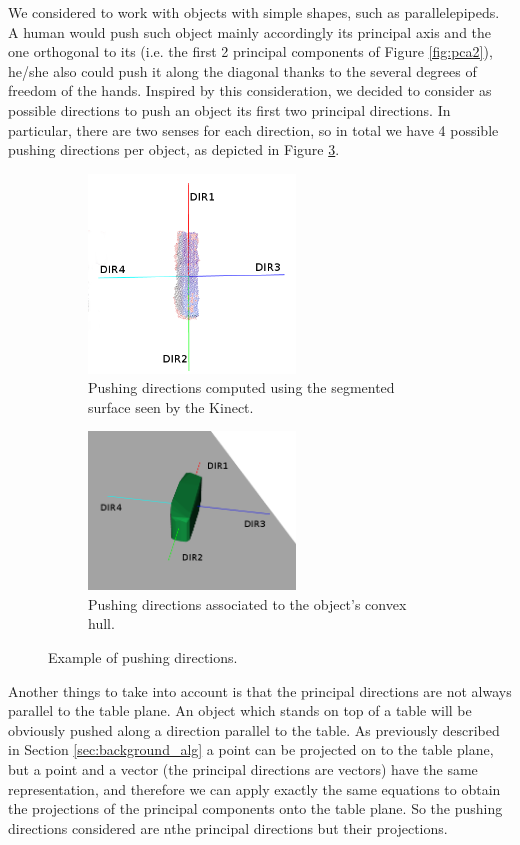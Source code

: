 We considered to work with objects with simple shapes, such as parallelepipeds. 
A human would push such object mainly accordingly its principal axis and the one orthogonal to its (i.e. the first 2 principal components of Figure \ref{fig:pca2}), he/she also could push it along the diagonal thanks to the several degrees of freedom of the hands. 
Inspired by this consideration, we decided to consider as possible directions to push an object  its first two principal directions. In particular, there are two senses for each direction, so in total we have 4 possible pushing directions per object, as depicted in Figure \ref{fig:directions}.

\begin{figure}
\centering
\begin{subfigure}[t]{6cm}
\includegraphics[width=5.5cm]{Img/pushing/directions.png}
\caption{Pushing directions computed using the segmented surface seen by the Kinect.}\label{fig:directions1}
\end{subfigure}
\quad
\begin{subfigure}[t]{6cm}
\includegraphics[width=5.5cm]{Img/pushing/directions2.png}
\caption{Pushing directions associated to the object's convex hull.}
\label{fig:directions2}
\end{subfigure}
\caption{Example of pushing directions.}\label{fig:directions}
\end{figure}

Another things to take into account is that the principal directions are not always parallel to the table plane. An object which stands on top of a table will be obviously pushed along a direction parallel to the table. As previously described in Section \ref{sec:background_alg} a point can be projected on to the table plane, but a point and a vector (the principal directions are vectors) have the same representation, and therefore we can apply exactly the same equations to obtain the projections of the principal components onto the table plane. So the pushing directions considered are nthe principal directions but their projections. 


